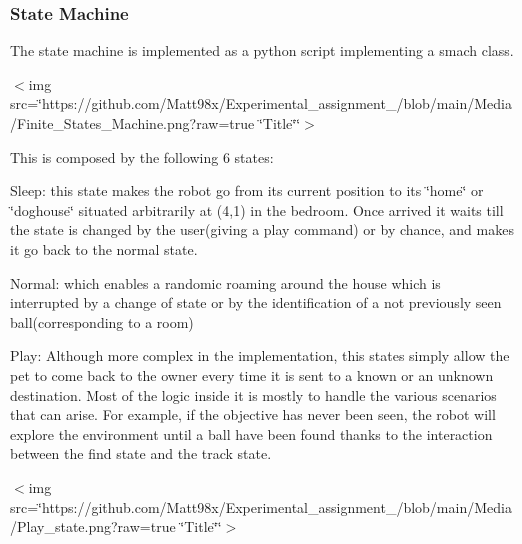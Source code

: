 \subsubsection*{State Machine}

The state machine is implemented as a python script implementing a smach class. 

$<$img src=\char`\"{}https\+://github.\+com/\+Matt98x/\+Experimental\+\_\+assignment\+\_/blob/main/\+Media/\+Finite\+\_\+\+States\+\_\+\+Machine.\+png?raw=true \char`\"{}Title\char`\"{}\char`\"{}$>$ 

This is composed by the following 6 states\+:
\begin{DoxyItemize}
\item Sleep\+: this state makes the robot go from its current position to its \char`\"{}home\char`\"{} or \char`\"{}doghouse\char`\"{} situated arbitrarily at (4,1) in the bedroom. Once arrived it waits till the state is changed by the user(giving a play command) or by chance, and makes it go back to the normal state.
\item Normal\+: which enables a randomic roaming around the house which is interrupted by a change of state or by the identification of a not previously seen ball(corresponding to a room)
\item Play\+: Although more complex in the implementation, this states simply allow the pet to come back to the owner every time it is sent to a known or an unknown destination. Most of the logic inside it is mostly to handle the various scenarios that can arise. For example, if the objective has never been seen, the robot will explore the environment until a ball have been found thanks to the interaction between the find state and the track state. 
\end{DoxyItemize}

$<$img src=\char`\"{}https\+://github.\+com/\+Matt98x/\+Experimental\+\_\+assignment\+\_/blob/main/\+Media/\+Play\+\_\+state.\+png?raw=true \char`\"{}Title\char`\"{}\char`\"{}$>$ 


